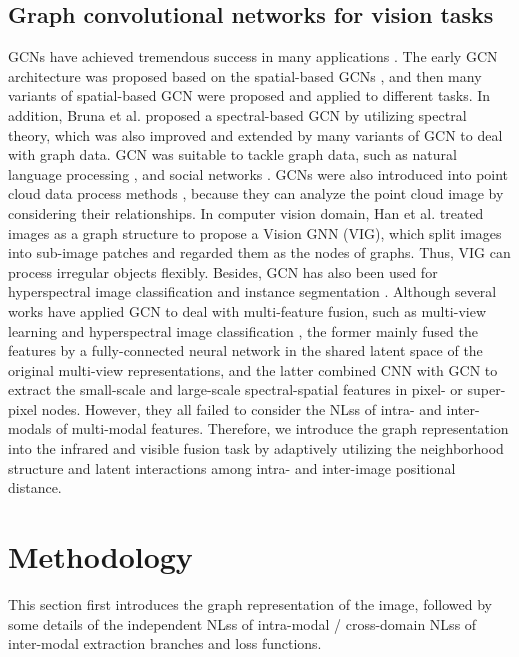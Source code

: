 \documentclass[journal]{IEEEtran}
\begin{document}
\subsection{Graph convolutional networks for vision tasks}
GCNs have achieved tremendous success in many applications \cite{bai2020learning}. The early GCN architecture was proposed based on the spatial-based GCNs \cite{micheli2009neural}, and then many variants of spatial-based GCN were proposed and applied to different tasks. In addition, Bruna et al. \cite{bruna2013spectral} proposed a spectral-based GCN by utilizing spectral theory, which was also improved and extended by many variants of GCN to deal with graph data. GCN was suitable to tackle graph data, such as natural language processing \cite{bastings2017graph}, and social networks \cite{tang2009relational}. GCNs were also introduced into point cloud data process methods \cite{simonovsky2017dynamic}, because they can analyze the point cloud image by considering their relationships. In computer vision domain, Han et al. \cite{han2022vision} treated images as a graph structure to propose a Vision GNN (VIG), which split images into sub-image patches and regarded them as the nodes of graphs. Thus, VIG can process irregular objects flexibly. Besides, GCN has also been used for hyperspectral image classification \cite{yu2022edge} and instance segmentation \cite{fan2020correlation}. Although several works have applied GCN to deal with multi-feature fusion, such as multi-view learning \cite{chen2023learnable} and hyperspectral image classification \cite{liu2020cnn}, the former mainly fused the features by a fully-connected neural network in the shared latent space of the original multi-view representations, and the latter combined CNN with GCN to extract the small-scale and large-scale spectral-spatial features in pixel- or super-pixel nodes. However, they all failed to consider the NLss of intra- and inter-modals of multi-modal features. Therefore, we introduce the graph representation into the infrared and visible fusion task by adaptively utilizing the neighborhood structure and latent interactions among intra- and inter-image positional distance.

\section{Methodology}
\label{}
This section first introduces the graph representation of the image, followed by some details of the independent NLss of intra-modal / cross-domain NLss of inter-modal extraction branches and loss functions.
\end{document}
